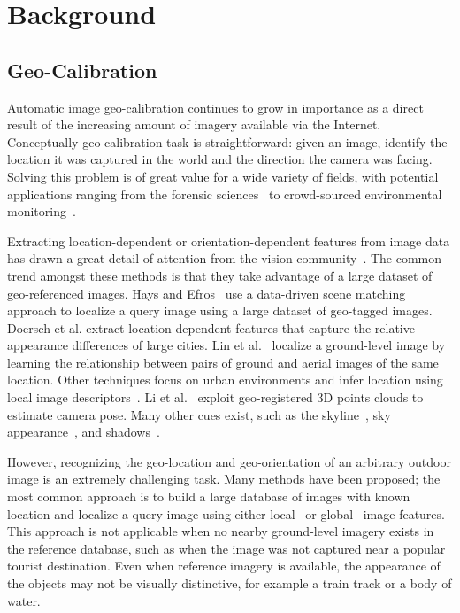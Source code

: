 \section{Background}

\subsection{Geo-Calibration}
Automatic image geo-calibration continues to grow in importance as a
direct result of the increasing amount of imagery available
via the Internet. Conceptually geo-calibration task is
straightforward: given an image, identify the location it was captured
in the world and the direction the camera was facing. Solving this
problem is of great value for a wide variety of fields, with potential
applications ranging from the forensic sciences~\cite{stylianou13jane}
to crowd-sourced environmental monitoring~\cite{zhang2012mining}.

Extracting location-dependent or orientation-dependent features from
image data has drawn a great detail of attention from the vision
community~\cite{jacobs07geolocate, jacobs11geolocate,
jacobs08geoorient}. The common trend amongst these methods is that
they take advantage of a large dataset of geo-referenced images. Hays
and Efros~\cite{hays2008im2gps} use a data-driven scene matching
approach to localize a query image using a large dataset of geo-tagged
images.  Doersch et al. extract location-dependent features that
capture the relative appearance differences of large cities.  Lin et
al.~\cite{lin2013cross} localize a ground-level image by learning the
relationship between pairs of ground and aerial images of the same
location. Other techniques focus on urban environments and infer
location using local image
descriptors~\cite{schindler2008detecting,snavely2006photo}. Li et
al.~\cite{li2012worldwide} exploit geo-registered 3D points clouds to
estimate camera pose. Many other cues exist, such as the
skyline~\cite{baatz2012large,ramalingam2009geolocalization}, sky
appearance~\cite{lalonde2010sun,workman2014rainbow}, and
shadows~\cite{junejo2008estimating,wu2010geo}.

However, recognizing the geo-location and geo-orientation of an
arbitrary outdoor image is an extremely challenging task.  Many
methods have been proposed; the most common approach is to build a
large database of images with known location and localize a query
image using either local~\cite{li2010location,schindler2008detecting}
or global~\cite{hays2008im2gps,doersch2012what} image features.  This
approach is not applicable when no nearby ground-level imagery exists
in the reference database, such as when the image was not captured
near a popular tourist destination.  Even when reference imagery is
available, the appearance of the objects may not be visually
distinctive, for example a train track or a body of water. 


